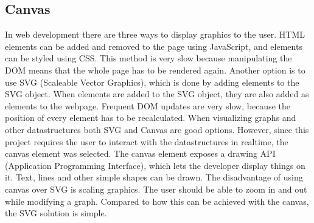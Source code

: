 \subsection{Canvas}
In web development there are three ways to display graphics to the user. HTML elements can be added and removed to the page using JavaScript, and elements can be styled using CSS. This method is very slow because manipulating the DOM means that the whole page has to be rendered again. Another option is to use SVG (Scaleable Vector Graphics), which is done by adding elements to the SVG object. When elements are added to the SVG object, they are also added as elements to the webpage. Frequent DOM updates are very slow, because the position of every element has to be recalculated. When visualizing graphs and other datastructures both SVG and Canvas are good options. However, since this project requires the user to interact with the datastructures in realtime, the canvas element was selected. The canvas element exposes a drawing API (Application Programming Interface), which lets the developer display things on it. Text, lines and other simple shapes can be drawn. The disadvantage of using canvas over SVG is scaling graphics. The user should be able to zoom in and out while modifying a graph. Compared to how this can be achieved with the canvas, the SVG solution is simple.